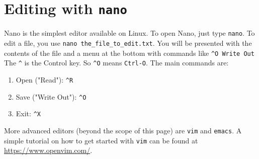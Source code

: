 \section{Editing with \texttt{nano}}

Nano is the simplest editor available on Linux. To open Nano, just type
\verb|nano|. To edit a file, you use \verb|nano the_file_to_edit.txt|. You will
be presented with the contents of the file and a menu at the bottom with
commands like \verb|^O Write Out| The \verb|^| is the Control key. So \verb|^O| means
\verb|Ctrl-O|. The main commands are:

\begin{enumerate}
\item Open ("Read"): \verb|^R|
\item Save ("Write Out"): \verb|^O|
\item Exit: \verb|^X|
\end{enumerate}

More advanced editors (beyond the scope of this page) are \verb|vim| and \verb|emacs|.
A simple tutorial on how to get started with \verb|vim| can be found at \url{https://www.openvim.com/}.
